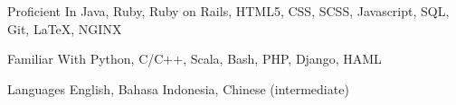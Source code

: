 


\begin{cvskills}


	\cvskill
	{Proficient In}
	{Java, Ruby, Ruby on Rails, HTML5, CSS, SCSS, Javascript, SQL, Git, LaTeX, NGINX}


	\cvskill
	{Familiar With}
	{Python, C/C++, Scala, Bash, PHP, Django, HAML}


	\cvskill
	{Languages}
	{English, Bahasa Indonesia, Chinese (intermediate)}


\end{cvskills}
